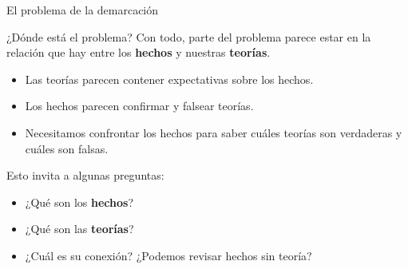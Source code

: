 \documentclass[
  ignorenonframetext,
]{beamer}
\providecommand{\tightlist}{%
  \setlength{\itemsep}{0pt}\setlength{\parskip}{0pt}}
\begin{document}
\begin{frame}{El problema de la demarcación}
\protect\hypertarget{el-problema-de-la-demarcaciuxf3n-4}{}
\begin{block}{¿Dónde está el problema?}
\protect\hypertarget{duxf3nde-estuxe1-el-problema}{}
Con todo, parte del problema parece estar en la relación que hay entre
los \textbf{hechos} y nuestras \textbf{teorías}.

\begin{itemize}
\tightlist
\item
  Las teorías parecen contener expectativas sobre los hechos.
\item
  Los hechos parecen confirmar y falsear teorías.
\item
  Necesitamos confrontar los hechos para saber cuáles teorías son
  verdaderas y cuáles son falsas.
\end{itemize}

Esto invita a algunas preguntas:

\begin{itemize}
\tightlist
\item
  ¿Qué son los \textbf{hechos}?
\item
  ¿Qué son las \textbf{teorías}?
\item
  ¿Cuál es su conexión? ¿Podemos revisar hechos sin teoría?
\end{itemize}
\end{block}
\end{frame}
\end{document}
